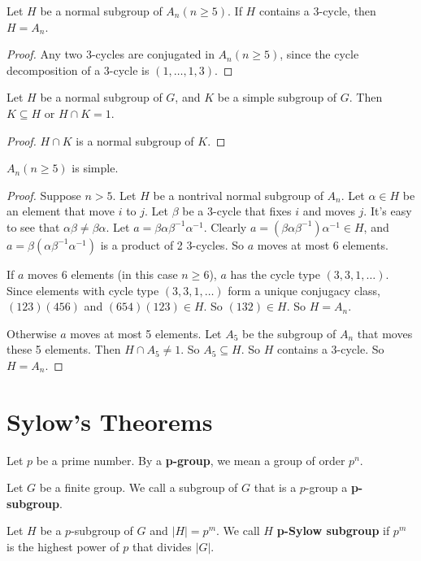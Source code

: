 \documentclass[12pt]{book}
\begin{document}
\begin{lemma}
	Let $H$ be a normal subgroup of $A_n(n\geq 5)$. If $H$ contains a 3-cycle, then $H=A_n$.
\end{lemma}
\begin{proof}
	Any two 3-cycles are conjugated in $A_n(n\geq 5)$, since the cycle decomposition of a 3-cycle is $(1,\dots,1,3)$.
\end{proof}

\begin{lemma}
	Let $H$ be a normal subgroup of $G$, and $K$ be a simple subgroup of $G$. Then $K\subseteq H$ or $H\cap K= 1$.
\end{lemma}
\begin{proof}
	$H\cap K$ is a normal subgroup of $K$.
\end{proof}

\begin{lemma}
	$A_n(n\geq 5)$ is simple.
\end{lemma}
\begin{proof}
	Suppose $n>5$. Let $H$ be a nontrival normal subgroup of $A_n$. Let $\alpha\in H$ be an element that move $i$ to $j$. Let $\beta$ be a 3-cycle that fixes $i$ and moves $j$. It's easy to see that $\alpha\beta\neq\beta\alpha$. Let $a=\beta\alpha\beta^{-1}\alpha^{-1}$. Clearly $a=(\beta\alpha\beta^{-1})\alpha^{-1}\in H$, and $a=\beta(\alpha\beta^{-1}\alpha^{-1})$ is a product of 2 3-cycles. So $a$ moves at most 6 elements.
	
	If $a$ moves 6 elements (in this case $n\geq 6$), $a$ has the cycle type $(3,3,1,\dots)$. Since elements with cycle type $(3,3,1,\dots)$ form a unique conjugacy class, $(123)(456)$ and $(654)(123)\in H$. So $(132)\in H$. So $H=A_n$.
	
	Otherwise $a$ moves at most 5 elements. Let $A_5$ be the subgroup of $A_n$ that moves these 5 elements. Then $H\cap A_5\neq 1$. So $A_5\subseteq H$. So $H$ contains a 3-cycle. So $H=A_n$.
\end{proof}
	
	\section{Sylow's Theorems}
	
	\begin{definition}
		Let $p$ be a prime number. By a {\bf p-group}, we mean a group of order $p^n$.
		
		Let $G$ be a finite group. We call a subgroup of $G$ that is a $p$-group a {\bf p-subgroup}.
		
		Let $H$ be a $p$-subgroup of $G$ and $|H|=p^m$. We call $H$ {\bf p-Sylow subgroup} if $p^m$ is the highest power of $p$ that divides $|G|$.
	\end{definition}
	
\end{document}
